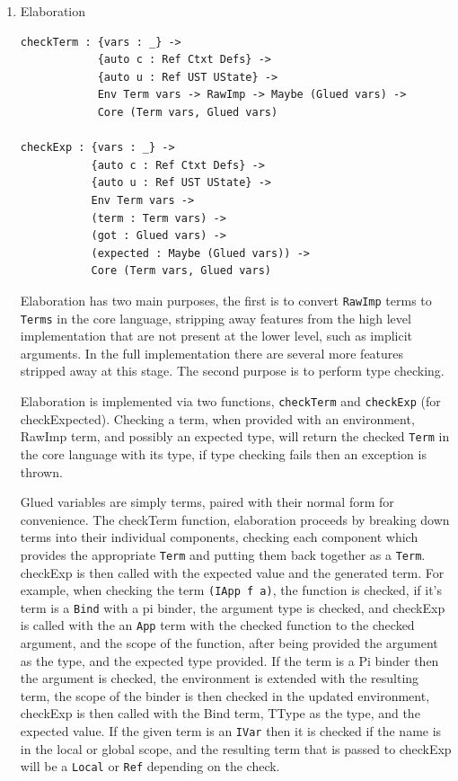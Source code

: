 \documentclass[a4paper]{article}
\begin{document}
\begin{enumerate}
\item Elaboration
\label{sec:org3c636be}
\begin{center}
\begin{verbatim}
checkTerm : {vars : _} ->
			{auto c : Ref Ctxt Defs} ->
			{auto u : Ref UST UState} ->
			Env Term vars -> RawImp -> Maybe (Glued vars) ->
			Core (Term vars, Glued vars)

checkExp : {vars : _} ->
		   {auto c : Ref Ctxt Defs} ->
		   {auto u : Ref UST UState} ->
		   Env Term vars ->
		   (term : Term vars) ->
		   (got : Glued vars) ->
		   (expected : Maybe (Glued vars)) ->
		   Core (Term vars, Glued vars)
\end{verbatim}
\end{center}

Elaboration has two main purposes, the first is to convert \texttt{RawImp} terms
to \texttt{Terms} in the core language, stripping away features from the high 
level implementation that are not present at the lower level, such as 
implicit arguments. In the full implementation there are several more 
features stripped away at this stage. The second purpose is to perform 
type checking.  

Elaboration is implemented via two functions, \texttt{checkTerm} and \texttt{checkExp}
(for checkExpected). Checking a term, when provided with an environment,
RawImp term, and possibly an expected type, will return the checked 
\texttt{Term} in the core language with its type, if type checking fails then an
exception is thrown. 

Glued variables are simply terms, paired with their normal form for 
convenience. The checkTerm function, elaboration proceeds by breaking
down terms into their individual components, checking each component
which provides the appropriate \texttt{Term} and putting them back together as
a \texttt{Term}. checkExp is then called with the expected value and the 
generated term. For example, when checking the term \texttt{(IApp f a)}, 
the function is checked, if it's term is a \texttt{Bind} with a pi binder, 
the argument type is checked, and checkExp is called with the an \texttt{App} 
term with the checked function to the checked argument, and the scope
of the function, after being provided the argument as the type, 
and the expected type provided. If the term is a Pi binder then the 
argument is checked, the environment is extended with the resulting 
term, the scope of the binder is then checked in the updated 
environment, checkExp is then called with the Bind term, TType as the 
type, and the expected value. If the given term is an \texttt{IVar} 
then it is checked if the name is in the local or global scope, and the
resulting term that is passed to checkExp will be a \texttt{Local} or \texttt{Ref} 
depending on the check.


\end{enumerate}
\end{document}
